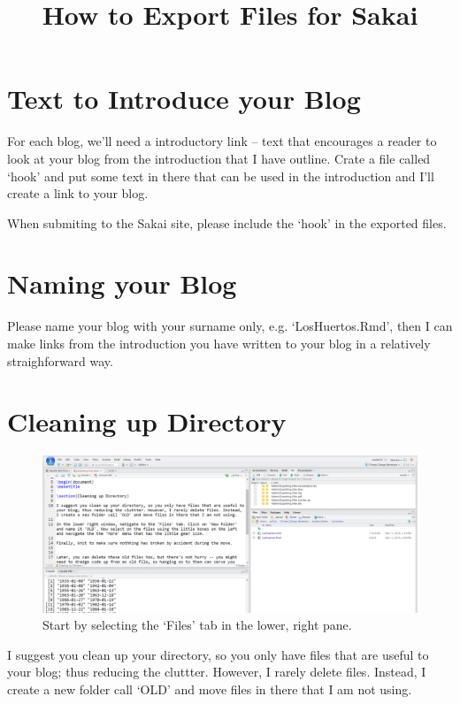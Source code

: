 \documentclass{article}\usepackage[]{graphicx}\usepackage[]{color}
\title{How to Export Files for Sakai}
\begin{document}
\maketitle

\section{Text to Introduce your Blog}

For each blog, we'll need a introductory link -- text that encourages a reader to look at your blog from the introduction that I have outline. Crate a file called `hook' and put some text in there that can be used in the introduction and I'll create a link to your blog. 

When submiting to the Sakai site, please include the `hook' in the exported files.  

\section{Naming your Blog}

Please name your blog with your surname only, e.g. `LosHuertos.Rmd', then I can make links from the introduction you have written to your blog in a relatively straighforward way. 

\section{Cleaning up Directory}

\begin{figure}
\includegraphics[width=\textwidth]{FourWindows}
\caption{Start by selecting the `Files' tab in the lower, right pane.}
\end{figure}

I suggest you clean up your directory, so you only have files that are useful to your blog; thus reducing the cluttter. However, I rarely delete files. Instead, I create a new folder call `OLD' and move files in there that I am not using.
\end{document}
